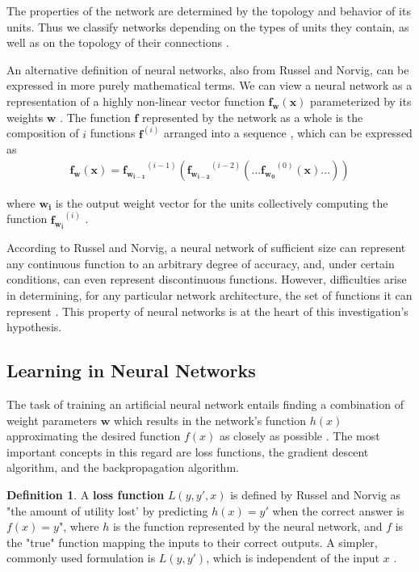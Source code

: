 \documentclass[12pt, titlepage]{report}
\theoremstyle{definition}
\newtheorem{definition}{Definition}
\begin{document}
The properties of the network are determined by the topology and behavior of its units. Thus we classify networks depending on the types of units they contain, as well as on the topology of their connections \cite[p. 729]{russel2009artificial}. 

An alternative definition of neural networks, also from Russel and Norvig, can be expressed in more purely mathematical terms. We can view a neural network as  a representation of a highly non-linear vector function $\bm{f}_{\bm{w}}(\bm{x})$ parameterized by its weights $\bm{w}$ \cite{russel2009artificial}. The function $\bm{f}$ represented by the network as a whole is the composition of $i$ functions $\bm{f}^(i)$ arranged into a sequence \cite{goodfellow2016deep}, which can be expressed as
 \begin{gather}\label{eq:neural_net_composition}
 \bm{f_w}(\bm{x}) = \bm{f_{w_{i - 1}}}^{(i - 1)}(\bm{f_{w_{i - 2}}}^{(i - 2)}(... \bm{f_{w_0}}^{(0)}(\bm{x}) ...))
\end{gather}

where $\bm{w_i}$ is the output weight vector for the units collectively computing the function $\bm{f_{w_i}}^{(i)}$ \cite{goodfellow2016deep}.

According to Russel and Norvig, a neural network of sufficient size can represent any continuous function to an arbitrary degree of accuracy, and, under certain conditions, can even represent discontinuous functions. However, difficulties arise in determining, for any particular network architecture, the set of functions it can represent \cite{russel2009artificial}. This property of neural networks is at the heart of this investigation's hypothesis.



\subsection{Learning in Neural Networks}
The task of training an artificial neural network entails finding a combination of weight parameters $\bm{w}$ which results in the network's function $h(x)$ approximating the desired function $f(x)$ as closely as possible \cite[p. 718]{russel2009artificial}. The most important concepts in this regard are loss functions, the gradient descent algorithm, and the backpropagation algorithm.
 
\begin{definition}
A \textbf{loss function} $L(y, y', x)$ is defined by Russel and Norvig as "the amount of utility lost' by predicting $h(x) = y'$ when the correct answer is $f(x) = y$", where $h$ is the function represented by the neural network, and $f$ is the "true" function mapping the inputs to their correct outputs. A simpler, commonly used formulation is $L(y, y')$, which is independent of the input $x$ \cite{russel2009artificial}.
\end{definition}
\end{document}
